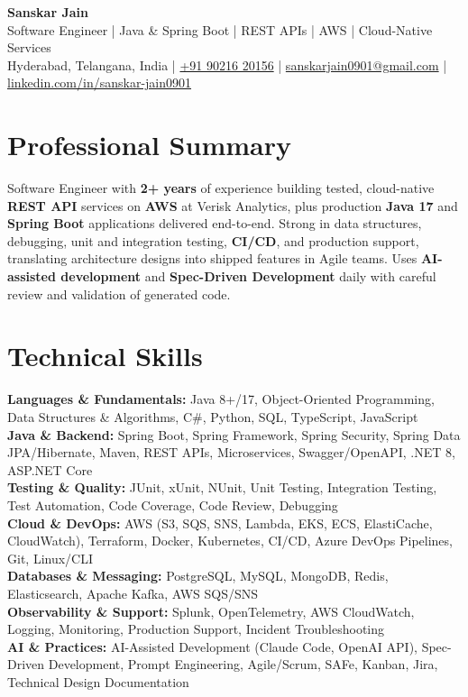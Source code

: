 \documentclass[a4paper,10pt]{article}
\begin{document}
\begin{center}
    {\LARGE \textbf{Sanskar Jain}} \\
    \vspace{2pt}
    Software Engineer \;|\; Java \& Spring Boot \;|\; REST APIs \;|\; AWS \;|\; Cloud-Native Services \\
    \vspace{2pt}
    Hyderabad, Telangana, India \;|\;
    \href{tel:+919021620156}{+91 90216 20156} \;|\;
    \href{mailto:sanskarjain0901@gmail.com}{sanskarjain0901@gmail.com} \;|\;
    \href{https://www.linkedin.com/in/sanskar-jain0901/}{linkedin.com/in/sanskar-jain0901}
\end{center}

\section*{Professional Summary}
Software Engineer with \textbf{2+ years} of experience building tested, cloud-native \textbf{REST API} services on \textbf{AWS} at Verisk Analytics, plus production \textbf{Java 17} and \textbf{Spring Boot} applications delivered end-to-end.
Strong in data structures, debugging, unit and integration testing, \textbf{CI/CD}, and production support, translating architecture designs into shipped features in Agile teams.
Uses \textbf{AI-assisted development} and \textbf{Spec-Driven Development} daily with careful review and validation of generated code.

\section*{Technical Skills}
\begin{sloppypar}
\noindent
\textbf{Languages \& Fundamentals:} Java 8+/17, Object-Oriented Programming, Data Structures \& Algorithms, C\#, Python, SQL, TypeScript, JavaScript \\
\textbf{Java \& Backend:} Spring Boot, Spring Framework, Spring Security, Spring Data JPA/Hibernate, Maven, REST APIs, Microservices, Swagger/OpenAPI, .NET 8, ASP.NET Core \\
\textbf{Testing \& Quality:} JUnit, xUnit, NUnit, Unit Testing, Integration Testing, Test Automation, Code Coverage, Code Review, Debugging \\
\textbf{Cloud \& DevOps:} AWS (S3, SQS, SNS, Lambda, EKS, ECS, ElastiCache, CloudWatch), Terraform, Docker, Kubernetes, CI/CD, Azure DevOps Pipelines, Git, Linux/CLI \\
\textbf{Databases \& Messaging:} PostgreSQL, MySQL, MongoDB, Redis, Elasticsearch, Apache Kafka, AWS SQS/SNS \\
\textbf{Observability \& Support:} Splunk, OpenTelemetry, AWS CloudWatch, Logging, Monitoring, Production Support, Incident Troubleshooting \\
\textbf{AI \& Practices:} AI-Assisted Development (Claude Code, OpenAI API), Spec-Driven Development, Prompt Engineering, Agile/Scrum, SAFe, Kanban, Jira, Technical Design Documentation
\end{sloppypar}
\end{document}
